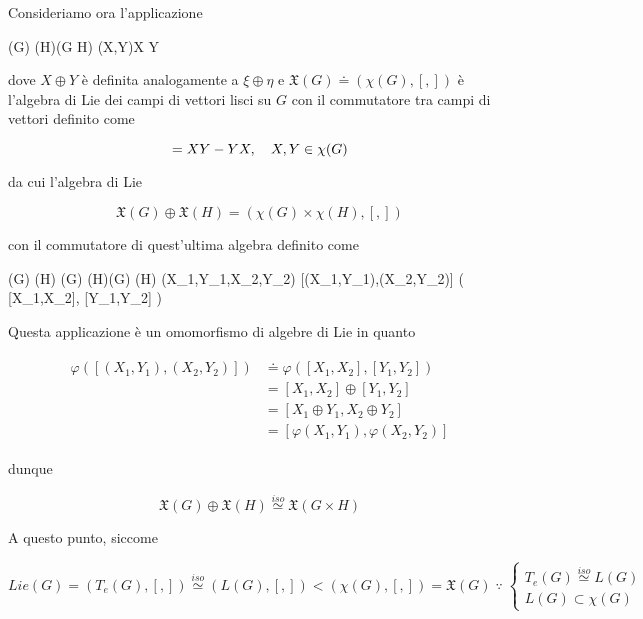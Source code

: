 {Consideriamo ora l'applicazione

\map{\varphi}
	{(G) \oplus {}(H)}{(G \times H)}
	{(X,Y)}{X \oplus Y}

dove $ X \oplus Y $ è definita analogamente a $ \xi \oplus \eta $ e $ \mathfrak{X}(G) \doteq (\chi(G), [,]) $ è l'algebra di Lie dei campi di vettori lisci su $ G $ con il commutatore tra campi di vettori definito come

\begin{equation}
	[X,Y] = X Y - Y X \qcomma X, Y \in \chi(G)
\end{equation}

da cui l'algebra di Lie

\begin{equation}
	\mathfrak{X}(G) \oplus \mathfrak{X}(H) = (\chi(G) \times \chi(H),[,])
\end{equation}

con il commutatore di quest'ultima algebra definito come

\map{[,]}
	{\chi(G) \times \chi(H) \times \chi(G) \times \chi(H)}{\chi(G) \times \chi(H)}
	{(X_{1},Y_{1},X_{2},Y_{2})}
	{[(X_{1},Y_{1}),(X_{2},Y_{2})] \doteq \left( [X_{1},X_{2}], [Y_{1},Y_{2}] \right)}

Questa applicazione è un omomorfismo di algebre di Lie in quanto

\begin{align}
	\begin{split}
		\varphi \left( [(X_{1},Y_{1}),(X_{2},Y_{2})] \right) &\doteq \varphi \left( [X_{1},X_{2}], [Y_{1},Y_{2}] \right) \\
		&= [X_{1},X_{2}] \oplus [Y_{1},Y_{2}] \\
		&= [X_{1} \oplus Y_{1}, X_{2} \oplus Y_{2}] \\
		&= \left[ \varphi(X_{1}, Y_{1}), \varphi(X_{2}, Y_{2}) \right]
	\end{split}
\end{align}

dunque

\begin{equation}
	\mathfrak{X}(G) \oplus \mathfrak{X}(H) \stackrel{iso}{\simeq} \mathfrak{X}(G \times H)
\end{equation}

A questo punto, siccome

\begin{equation}
	Lie(G) = (T_{e}(G),[,]) \stackrel{iso}{\simeq} (L(G),[,]) < (\chi(G),[,]) = \mathfrak{X}(G) %
	\; \because \; %
	\begin{cases}
		T_{e}(G) \stackrel{iso}{\simeq} L(G) \\
		L(G) \subset \chi(G)
	\end{cases}
\end{equation}

}
